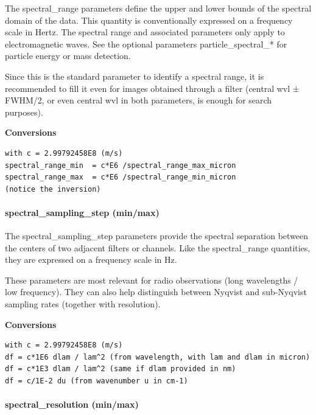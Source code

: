 \documentclass[11pt,a4paper]{ivoa}
\begin{document}
The spectral\_range parameters define the upper and lower bounds of the spectral domain of the data. This quantity is conventionally expressed on a frequency scale in Hertz. The spectral range and associated parameters only apply to electromagnetic waves. See the optional parameters particle\_spectral\_* for particle energy or mass detection.

Since this is the standard parameter to identify a spectral range, it is recommended to fill it even for images obtained through a filter (central wvl ± FWHM/2, or even central wvl in both parameters, is enough for search purposes). 





\textbf{Conversions}




\begin{verbatim}
with c = 2.99792458E8 (m/s)
spectral_range_min  = c*E6 /spectral_range_max_micron
spectral_range_max  = c*E6 /spectral_range_min_micron
(notice the inversion)
\end{verbatim}




\paragraph{spectral\_sampling\_step (min/max)}

The spectral\_sampling\_step parameters provide the spectral separation between the centers of two adjacent filters or channels. Like the spectral\_range quantities, they are expressed on a frequency scale in Hz. 

These parameters are most relevant for radio observations (long wavelengths / low frequency). They can also help distinguish between Nyqvist and sub-Nyqvist sampling rates (together with resolution).





\textbf{Conversions}




\begin{verbatim}
with c = 2.99792458E8 (m/s)
df = c*1E6 dlam / lam^2 (from wavelength, with lam and dlam in micron)
df = c*1E3 dlam / lam^2 (same if dlam provided in nm)
df = c/1E-2 du (from wavenumber u in cm-1)
\end{verbatim}




\paragraph{spectral\_resolution (min/max)}
\end{document}
